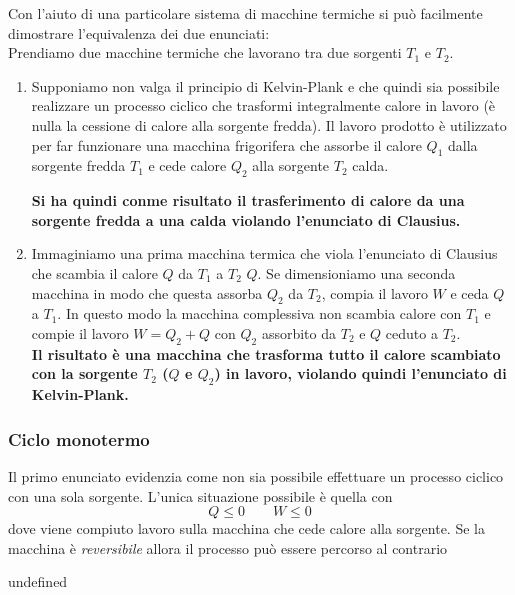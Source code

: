 Con l'aiuto di una particolare sistema di macchine termiche si può facilmente dimostrare l'equivalenza dei due enunciati: \\

\noindent
Prendiamo due macchine termiche che lavorano tra due sorgenti \(T_{1}\)
 e \(T_{2}\).
 \begin{enumerate}
 	\item Supponiamo non valga il principio di Kelvin-Plank e che quindi sia possibile realizzare un processo ciclico  che trasformi integralmente calore in lavoro (è nulla la cessione di calore alla sorgente fredda). Il lavoro prodotto è utilizzato per far funzionare una macchina frigorifera che assorbe il calore \(Q_{1}\) dalla sorgente fredda \(T_{1}\) e cede calore \(Q_{2}\) alla sorgente \(T_{2}\) calda.
 	
 	\textbf{Si ha quindi conme risultato il trasferimento di calore da una sorgente fredda a una calda violando l'enunciato di Clausius.}
 	
 	\item Immaginiamo una prima macchina termica che viola l'enunciato di Clausius che scambia il calore \(Q\) da \(T_{1}\) a \(T_{2}\) \(Q\). Se dimensioniamo una seconda macchina in modo che questa assorba \(Q_{2}\) da \(T_{2}\), compia il lavoro \(W\) e ceda \(Q\) a \(T_{1}\). In questo modo la macchina complessiva non scambia calore con \(T_{1}\) e compie il lavoro \(W = Q_{2} + Q\) con \(Q_{2}\) assorbito  da \(T_{2}\) e \(Q\) ceduto a \(T_{2}\). \\  
 	
 	\textbf{Il risultato è una macchina che trasforma tutto il calore scambiato con la sorgente \(T_{2}\) (\(Q\) e \(Q_{2}\)) in lavoro, violando quindi l'enunciato di Kelvin-Plank.}
 \end{enumerate}
 
 \subsubsection{Ciclo monotermo}
 Il primo enunciato evidenzia come non sia possibile effettuare un processo ciclico con una sola sorgente. L'unica situazione possibile è quella con 
 \[ 
 Q \leq 0 \qquad W \leq 0
 \]
 dove viene compiuto lavoro sulla macchina che cede calore alla sorgente. Se la macchina è \textit{reversibile} allora il processo può essere percorso al contrario 

 

undefined